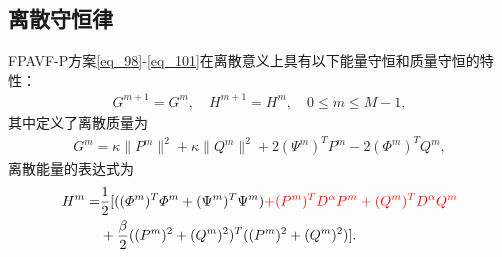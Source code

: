 \subsection{离散守恒律}
\begin{theorem}\label{thm4}
FPAVF-P方案\eqref{eq_98}-\eqref{eq_101}在离散意义上具有以下能量守恒和质量守恒的特性：
\begin{align}\label{eq_11141}
G^{m+1}=G^{m}, \quad H^{m+1}=H^{m}, \quad 0 \leq m \leq M-1,
\end{align}
其中定义了离散质量为
\begin{align}\label{eq_11142}
G^{m}=\kappa\|P^{m}\|^2+\kappa\|Q^{m}\|^2+2 \left(\Psi^{m}\right)^T P^{m}-2 \left(\varPhi^{m}\right)^T Q^{m},
\end{align}
离散能量的表达式为
\begin{align}
H^{m}=&\frac{1}{2}[((\varPhi^{m})^{T}\varPhi^{m}+(\Psi^{m})^{T}\Psi^{m})\textcolor[rgb]{1.00,0.00,0.00}{+(P^{m})^{T} D^{\alpha} P^{m}+(Q^{m})^{T} D^{\alpha} Q^{m}}\nonumber\\
&+\frac{\beta}{2}((P^{m})^2+(Q^{m})^2)^{T}((P^{m})^2+(Q^{m})^2)].\label{eq_800}
\end{align}
\end{theorem}

